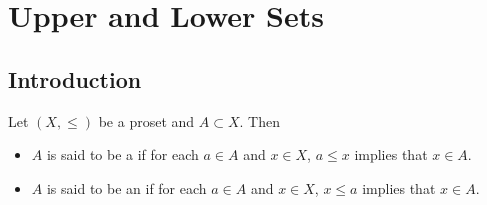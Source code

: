 \documentclass{book}
\begin{document}
	
	
	
	
	
	
	
	
	
	
	
	
	
	
	
	
	
	
	
	
	
	
	
	
	
	
	
	
	
	
	
	
	
	
	
	
	
	
	
	
	
	
	
	
	
	
	
	
	
	
	
	
	
	
	
	
	
	
	
	
	
	
	
	
	
	
	
	
	
	
	
	
	
	
	
	
	
	
	
	
	
	
	
	
	
	
	
	
	
	
	
	
	
	\newpage
	\chapter{Upper and Lower Sets}
	
	\section{Introduction}
	
	\begin{defn} 
		Let $(X, \leq)$ be a proset and $A \subset X$. Then 
		\begin{itemize}
			\item $A$ is said to be a  if for each $a \in A$ and $x \in X$, $a \leq x$ implies that $x \in A$.
			\item $A$ is said to be an  if for each $a \in A$ and $x \in X$, $x \leq a$ implies that $x \in A$.
		\end{itemize}
	\end{defn}
	
\end{document}
